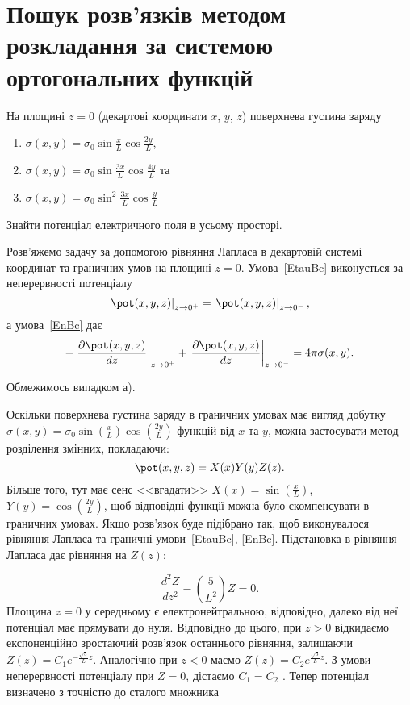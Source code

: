 \section{Пошук розв'язків методом розкладання за системою ортогональних функцій}
\begin{problem}\label{prb:charged_plates}
На площині $z=0$ (декартові координати $x$, $y$, $z$) поверхнева густина заряду
\begin{enumerate}[label=\alph*)]
	\item $\sigma(x, y) = \sigma_0 \sin\frac{x}{L}\cos\frac{2y}{L}$,
	\item  $\sigma(x, y) = \sigma_0 \sin\frac{3x}{L}\cos\frac{4y}{L}$ та
	\item  $\sigma(x, y) = \sigma_0 \sin^2\frac{3x}{L}\cos\frac{y}{L}$
\end{enumerate}
Знайти потенціал електричного поля в усьому просторі.
\begin{solution}
    Розв'яжемо задачу за допомогою рівняння Лапласа в декартовій системі координат  та граничних умов на площині $z = 0$. Умова~\eqref{EtauBc} виконується за неперервності потенціалу
	\begin{equation*}\label{continuity}
		\left.\pot(x,y,z)\right|_{z \to 0^+} = \left.\pot(x,y,z)\right|_{z \to 0^-},
	\end{equation*}
	а умова~\eqref{EnBc} дає
	\begin{equation*}\label{boundary}
		-\left. \frac{\partial \pot(x,y,z)}{dz}\right|_{z \to 0^+} + \left. \frac{\partial \pot(x,y,z)}{dz}\right|_{z \to 0^-} =4\pi\sigma(x,y).
	\end{equation*}

	Обмежимось випадком а).

	Оскільки поверхнева густина заряду в граничних умовах має вигляд добутку $\sigma(x, y) = \sigma_0 \sin\left( \frac{x}{L}\right) \cos\left( \frac{2y}{L}\right) $ функцій від $x$ та $y$, можна застосувати метод розділення змінних, покладаючи:
    \[
        \pot(x,y,z) = X(x)Y(y)Z(z).
    \]
Більше того, тут має сенс <<вгадати>> $X(x) = \sin\left(\frac{x}{L}\right) $, $Y(y) =
\cos\left(\frac{2y}{L}\right) $, щоб відповідні функції можна було скомпенсувати в граничних умовах.
Якщо розв’язок буде підібрано так, щоб виконувалося рівняння Лапласа та граничні умови~\eqref{EtauBc},
\eqref{EnBc}.%
Підстановка в рівняння Лапласа дає рівняння на $Z(z)$:

\begin{equation*}
    \frac{d^2Z}{dz^2} - \left( \frac{5}{L^2}\right) Z = 0.
\end{equation*}
Площина  $z = 0$ у середньому є електронейтральною, відповідно, далеко від неї потенціал має прямувати до нуля. Відповідно до цього, при $z >0$  відкидаємо експоненційно зростаючий розв’язок останнього рівняння, залишаючи $ Z(z) = C_1  e^{-\frac{\sqrt5}{L}z} $. Аналогічно при $z < 0$  маємо $ Z(z) = C_2  e^{\frac{\sqrt5}{L}z} $. З умови неперервності потенціалу при $Z = 0$, дістаємо $C_1 = C_2$ . Тепер потенціал визначено з точністю до сталого множника



\end{solution}
\end{problem}
